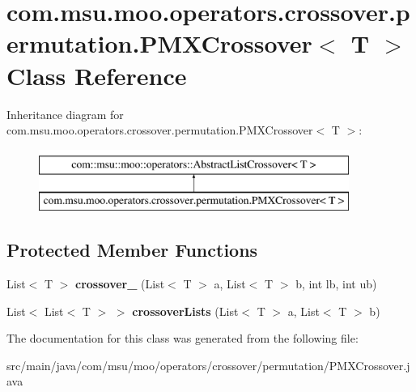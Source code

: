 \hypertarget{classcom_1_1msu_1_1moo_1_1operators_1_1crossover_1_1permutation_1_1PMXCrossover_3_01T_01_4}{\section{com.\-msu.\-moo.\-operators.\-crossover.\-permutation.\-P\-M\-X\-Crossover$<$ T $>$ Class Reference}
\label{classcom_1_1msu_1_1moo_1_1operators_1_1crossover_1_1permutation_1_1PMXCrossover_3_01T_01_4}
}
Inheritance diagram for com.\-msu.\-moo.\-operators.\-crossover.\-permutation.\-P\-M\-X\-Crossover$<$ T $>$\-:\begin{figure}[H]
\begin{center}
\leavevmode
\includegraphics[height=2.000000cm]{classcom_1_1msu_1_1moo_1_1operators_1_1crossover_1_1permutation_1_1PMXCrossover_3_01T_01_4}
\end{center}
\end{figure}
\subsection*{Protected Member Functions}
\begin{DoxyCompactItemize}
\item 
\hypertarget{classcom_1_1msu_1_1moo_1_1operators_1_1crossover_1_1permutation_1_1PMXCrossover_3_01T_01_4_a10e8e4b1363f0ce2921ad38b88f81bbe}{List$<$ T $>$ {\bfseries crossover\-\_\-} (List$<$ T $>$ a, List$<$ T $>$ b, int lb, int ub)}\label{classcom_1_1msu_1_1moo_1_1operators_1_1crossover_1_1permutation_1_1PMXCrossover_3_01T_01_4_a10e8e4b1363f0ce2921ad38b88f81bbe}

\item 
\hypertarget{classcom_1_1msu_1_1moo_1_1operators_1_1crossover_1_1permutation_1_1PMXCrossover_3_01T_01_4_a099893f6f25f515ea94e9042ca87f515}{List$<$ List$<$ T $>$ $>$ {\bfseries crossover\-Lists} (List$<$ T $>$ a, List$<$ T $>$ b)}\label{classcom_1_1msu_1_1moo_1_1operators_1_1crossover_1_1permutation_1_1PMXCrossover_3_01T_01_4_a099893f6f25f515ea94e9042ca87f515}

\end{DoxyCompactItemize}


The documentation for this class was generated from the following file\-:\begin{DoxyCompactItemize}
\item 
src/main/java/com/msu/moo/operators/crossover/permutation/P\-M\-X\-Crossover.\-java\end{DoxyCompactItemize}
